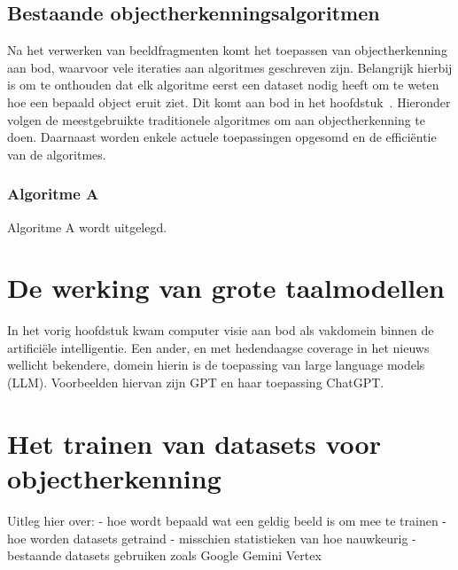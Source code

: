\subsection{Bestaande objectherkenningsalgoritmen}\label{subsec:bestaande-algoritmen}
Na het verwerken van beeldfragmenten komt het toepassen van objectherkenning aan bod, waarvoor vele iteraties aan algoritmes geschreven zijn.
Belangrijk hierbij is om te onthouden dat elk algoritme eerst een dataset nodig heeft om te weten hoe een bepaald object eruit ziet.
Dit komt aan bod in het hoofdstuk~.
Hieronder volgen de meestgebruikte traditionele algoritmes om aan objectherkenning te doen.
Daarnaast worden enkele actuele toepassingen opgesomd en de effici\"entie van de algoritmes.

\subsubsection{Algoritme A}
Algoritme A wordt uitgelegd.



\section{De werking van grote taalmodellen}
\label{sec:ls-artificiele-intelligentie}
In het vorig hoofdstuk kwam computer visie aan bod als vakdomein binnen de artifici\"ele intelligentie.
Een ander, en met hedendaagse coverage in het nieuws wellicht bekendere, domein hierin is de toepassing van large language models (LLM).
Voorbeelden hiervan zijn GPT en haar toepassing ChatGPT. %

\section{Het trainen van datasets voor objectherkenning}\label{sec:datasets}
Uitleg hier over: %
- hoe wordt bepaald wat een geldig beeld is om mee te trainen
- hoe worden datasets getraind
- misschien statistieken van hoe nauwkeurig
- bestaande datasets gebruiken zoals Google Gemini Vertex
